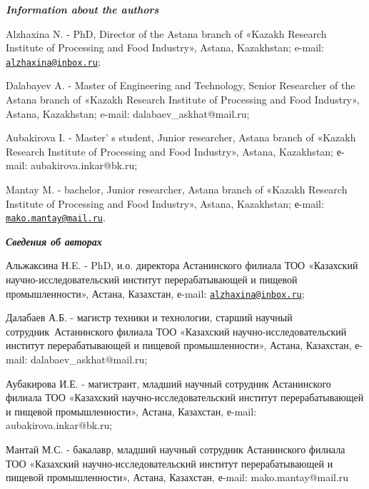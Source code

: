 \begin{authorinfo}
\emph{{\bfseries Information about the authors}}

Alzhaxina N. - PhD, Director of the Astana branch of «Kazakh Research
Institute of Processing and Food Industry», Astana, Kazakhstan; e-mail:
\href{mailto:alzhaxina@inbox.ru}{\nolinkurl{alzhaxina@inbox.ru}};

Dalabayev A. - Master of Engineering and Technology, Senior Researcher
of the Astana branch of «Kazakh Research Institute of Processing and
Food Industry», Astana, Kazakhstan; e-mail: dalabaev\_askhat@mail.ru;

Aubakirova I. - Master' s student, Junior researcher,
Astana branch of «Kazakh Research Institute of Processing and Food
Industry», Astana, Kazakhstan; е-mail: aubakirova.inkar@bk.ru;

Mantay M. - bachelor, Junior researcher, Astana branch of «Kazakh
Research Institute of Processing and Food Industry», Astana, Kazakhstan;
е-mail:
\href{mailto:mako.mantay@mail.ru}{\nolinkurl{mako.mantay@mail.ru}}.

\emph{{\bfseries Сведения об авторах}}

Альжаксина Н.E. - PhD, и.о. директора Астанинского филиала ТОО
«Казахский научно-исследовательский институт перерабатывающей и пищевой
промышленности», Астана, Казахстан, е-mail:
\href{mailto:alzhaxina@inbox.ru}{\nolinkurl{alzhaxina@inbox.ru}};

Далабаев А.Б. - магистр техники и технологии, старший научный
сотрудник~Астанинского филиала ТОО «Казахский научно-исследовательский
институт перерабатывающей и пищевой промышленности», Астана, Казахстан,
е-mail: dalabaev\_askhat@mail.ru;

Аубакирова И.Е. - магистрант, младший научный сотрудник Астанинского
филиала ТОО «Казахский научно-исследовательский институт
перерабатывающей и пищевой промышленности», Астана, Казахстан, е-mail:
aubakirova.inkar@bk.ru;

Мантай М.С. - бакалавр, младший научный сотрудник Астанинского филиала
ТОО «Казахский научно-исследовательский институт перерабатывающей и
пищевой промышленности», Астана, Казахстан, е-mail: mako.mantay@mail.ru~
\end{authorinfo}
